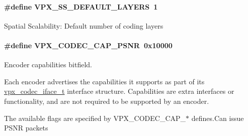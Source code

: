 \paragraph[{\texorpdfstring{V\+P\+X\+\_\+\+S\+S\+\_\+\+D\+E\+F\+A\+U\+L\+T\+\_\+\+L\+A\+Y\+E\+RS}{VPX_SS_DEFAULT_LAYERS}}]{\setlength{\rightskip}{0pt plus 5cm}\#define V\+P\+X\+\_\+\+S\+S\+\_\+\+D\+E\+F\+A\+U\+L\+T\+\_\+\+L\+A\+Y\+E\+RS~1}\hypertarget{group__encoder_ga8324b8c1ebf8a80253d544584f9439eb}{}\label{group__encoder_ga8324b8c1ebf8a80253d544584f9439eb}
Spatial Scalability\+: Default number of coding layers 
\paragraph[{\texorpdfstring{V\+P\+X\+\_\+\+C\+O\+D\+E\+C\+\_\+\+C\+A\+P\+\_\+\+P\+S\+NR}{VPX_CODEC_CAP_PSNR}}]{\setlength{\rightskip}{0pt plus 5cm}\#define V\+P\+X\+\_\+\+C\+O\+D\+E\+C\+\_\+\+C\+A\+P\+\_\+\+P\+S\+NR~0x10000}\hypertarget{group__encoder_ga398803f408d6f71aae730b5ee7793e1c}{}\label{group__encoder_ga398803f408d6f71aae730b5ee7793e1c}


Encoder capabilities bitfield. 

Each encoder advertises the capabilities it supports as part of its \hyperlink{group__codec_gae99c3b04f4a567a311211cce3ae6b83b}{vpx\+\_\+codec\+\_\+iface\+\_\+t} interface structure. Capabilities are extra interfaces or functionality, and are not required to be supported by an encoder.

The available flags are specified by V\+P\+X\+\_\+\+C\+O\+D\+E\+C\+\_\+\+C\+A\+P\+\_\+$\ast$ defines.\+Can issue P\+S\+NR packets 
